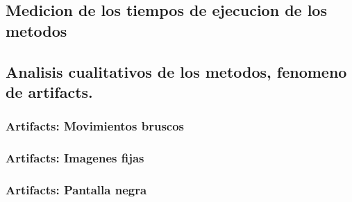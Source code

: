\subsection{Medicion de los tiempos de ejecucion de los metodos}


\subsection{Analisis cualitativos de los metodos, fenomeno de artifacts.}

\subsubsection{Artifacts: Movimientos bruscos}

\subsubsection{Artifacts: Imagenes fijas}

\subsubsection{Artifacts: Pantalla negra}
